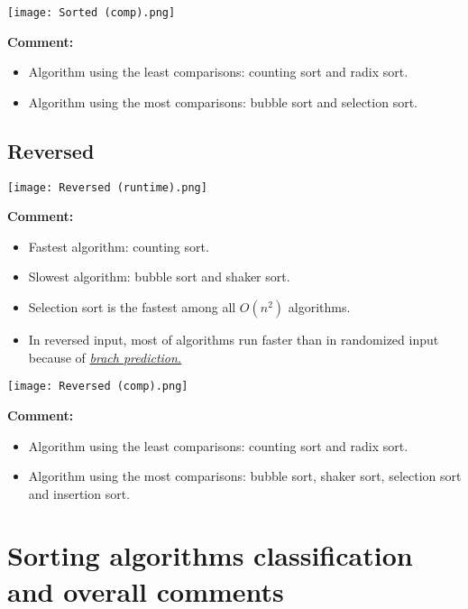 \documentclass[12pt]{article}
\begin{document}
\begin{center}
    \newpage
    \texttt{[image: Sorted (comp).png]}
\end{center}
\textbf{Comment:}
\begin{itemize}
    \item Algorithm using the least comparisons: counting sort and radix sort.
    \item Algorithm using the most comparisons: bubble sort and selection sort.
\end{itemize}

\newpage
\subsection{Reversed}
\begin{center}
    \texttt{[image: Reversed (runtime).png]}
\end{center}
\textbf{Comment:}
\begin{itemize}
    \item Fastest algorithm: counting sort.
    \item Slowest algorithm: bubble sort and shaker sort.
    \item Selection sort is the fastest among all $O(n^2)$ algorithms.
    \item In reversed input, most of algorithms run faster than in randomized input because of \href{https://stackoverflow.com/questions/11227809/why-is-processing-a-sorted-array-faster-than-processing-an-unsorted-array}{\emph{brach prediction.}}
\end{itemize}

\begin{center}
    \newpage
    \texttt{[image: Reversed (comp).png]}
\end{center}
\textbf{Comment:}
\begin{itemize}
    \item Algorithm using the least comparisons: counting sort and radix sort.
    \item Algorithm using the most comparisons: bubble sort, shaker sort, selection sort and insertion sort.
\end{itemize}

\newpage
\section{Sorting algorithms classification and overall comments}
\end{document}
